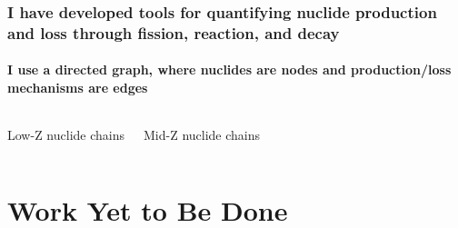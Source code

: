 \documentclass[compress,10pt]{beamer}
\begin{document}
\begin{frame}
    \frametitle{I have developed tools for quantifying nuclide production and loss through fission, reaction, and decay}
    \framesubtitle{I use a directed graph, where nuclides are nodes and production/loss mechanisms are edges}

    \vspace{-2mm}

    \centering
    \begin{columns}[t]


        \centering
        {\small Low-Z nuclide chains}


        \centering
        {\small Mid-Z nuclide chains}

    \end{columns}

    \begin{columns}[c]


        \centering


        \centering

    \end{columns}

\end{frame}



\section{Work Yet to Be Done}
\end{document}
